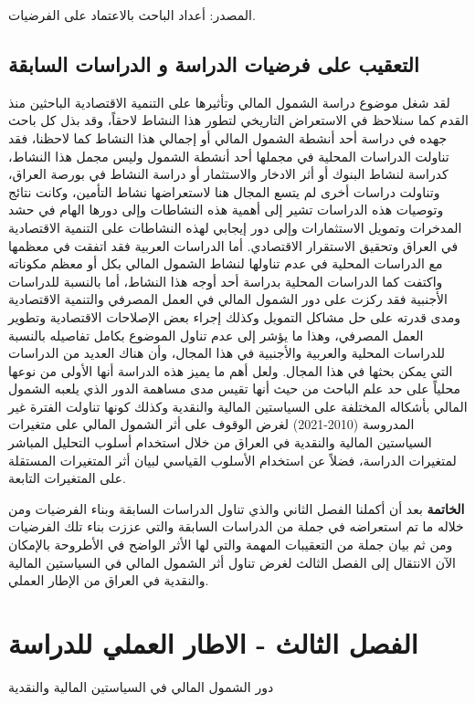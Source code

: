 \documentclass[10pt,a4paper]{report}
\begin{document}
\begin{doublespacing}
\begin{table}[H]
{\begin{tabular}{|c|c|c|c|c|}
\end{tabular}%
}
\end{table}

المصدر: أعداد الباحث بالاعتماد على الفرضيات.
\section{التعقيب على فرضيات الدراسة و الدراسات السابقة}
لقد شغل موضوع دراسة الشمول المالي وتأثيرها على التنمية الاقتصادية الباحثين منذ القدم كما سنلاحظ في الاستعراض التاريخي لتطور هذا النشاط لاحقاً، وقد بذل كل باحث جهده في دراسة أحد أنشطة الشمول المالي أو إجمالي هذا النشاط كما لاحظنا، فقد تناولت الدراسات المحلية في مجملها أحد أنشطة الشمول وليس مجمل هذا النشاط، كدراسة لنشاط البنوك أو أثر الادخار والاستثمار أو دراسة النشاط في بورصة العراق، وتناولت دراسات أخرى لم يتسع المجال هنا لاستعراضها نشاط التأمين، وكانت نتائج وتوصيات هذه الدراسات تشير إلى أهمية هذه النشاطات وإلى دورها الهام في حشد المدخرات وتمويل الاستثمارات وإلى دور إيجابي لهذه النشاطات على التنمية الاقتصادية في العراق وتحقيق الاستقرار الاقتصادي. أما الدراسات العربية فقد اتفقت في معظمها مع الدراسات المحلية في عدم تناولها لنشاط الشمول المالي بكل أو معظم مكوناته واكتفت كما الدراسات المحلية بدراسة أحد أوجه هذا النشاط، أما بالنسبة للدراسات الأجنبية فقد ركزت على دور الشمول المالي في العمل المصرفي والتنمية الاقتصادية ومدى قدرته على حل مشاكل التمويل وكذلك إجراء بعض الإصلاحات الاقتصادية وتطوير العمل المصرفي، وهذا ما يؤشر إلى عدم تناول الموضوع بكامل تفاصيله بالنسبة للدراسات المحلية والعربية والأجنبية في هذا المجال، وأن هناك العديد من الدراسات التي يمكن بحثها في هذا المجال. ولعل أهم ما يميز هذه الدراسة أنها الأولى من نوعها محلياً على حد علم الباحث من حيث أنها تقيس مدى مساهمة الدور الذي يلعبه الشمول المالي بأشكاله المختلفة على السياستين المالية والنقدية وكذلك كونها تناولت الفترة غير المدروسة (2010-2021) لغرض الوقوف على أثر الشمول المالي على متغيرات السياستين المالية والنقدية في العراق من خلال استخدام أسلوب التحليل المباشر لمتغيرات الدراسة، فضلاً عن استخدام الأسلوب القياسي لبيان أثر المتغيرات المستقلة على المتغيرات التابعة.

\textbf{الخاتمة}
بعد أن أكملنا الفصل الثاني والذي تناول الدراسات السابقة وبناء الفرضيات ومن خلاله ما تم استعراضه في جملة من الدراسات السابقة والتي عززت بناء تلك الفرضيات ومن ثم بيان جملة من التعقيبات المهمة والتي لها الأثر الواضح في الأطروحة بالإمكان الآن الانتقال إلى الفصل الثالث لغرض تناول أثر الشمول المالي في السياستين المالية والنقدية في العراق من الإطار العملي.
\chapter{الفصل الثالث - الاطار العملي للدراسة}
\begin{center}
	\Huge{دور الشمول المالي في السياستين المالية والنقدية}
\end{center}
\thispagestyle{empty}
\clearpage

\end{doublespacing}
\end{document}
